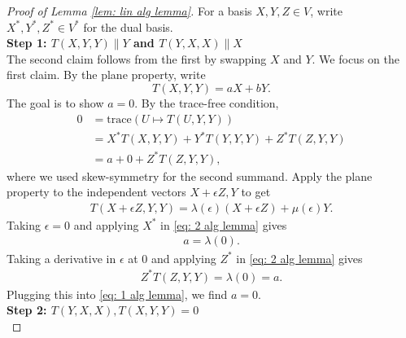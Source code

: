 \documentclass[10pt,a4paper]{amsart}
\begin{document}
    \begin{proof}[Proof of Lemma \ref{lem: lin alg lemma}]

    For a basis $X,Y,Z \in V$, write $X^*, Y^*, Z^* \in V^*$ for the dual basis. \\
    
    \noindent \textbf{Step 1: $T(X,Y,Y) \| Y$ and $T(Y,X,X) \| X$}\\
    
    The second claim follows from the first by swapping $X$ and $Y$. We focus on the first claim. 
    By the plane property, write 
    \begin{equation}
    T(X,Y,Y) = aX + bY.
    \end{equation}
    The goal is to show $a = 0$. By the trace-free condition, 
    \begin{align} \label{eq: 1 alg lemma}
        0 &= \mathrm{trace}(U \mapsto T(U,Y,Y)) \\
        &=X^*T(X,Y,Y) + Y^*T(Y,Y,Y) + Z^*T(Z,Y,Y) \\
        &= a + 0 + Z^*T(Z,Y,Y),
    \end{align}
    where we used skew-symmetry for the second summand. Apply the plane property to the independent vectors $X + \epsilon Z, Y$ to get 
    \begin{align}\label{eq: 2 alg lemma}
        T(X+ \epsilon Z,Y,Y) = \lambda(\epsilon) (X + \epsilon Z) + \mu(\epsilon) Y. 
    \end{align}
    Taking $\epsilon = 0$ and applying $X^*$ in \eqref{eq: 2 alg lemma} gives 
    \begin{align}
        a = \lambda(0). 
    \end{align}
    Taking a derivative in $\epsilon$ at $0$ and applying $Z^*$ in \eqref{eq: 2 alg lemma} gives 
    \begin{align}
        Z^*T(Z,Y,Y) = \lambda(0) = a.
    \end{align}
    Plugging this into \eqref{eq: 1 alg lemma}, we find $a = 0$.\\


\noindent \textbf{Step 2: $T(Y,X,X), T(X,Y,Y) = 0$}\\


\end{proof}
\end{document}
